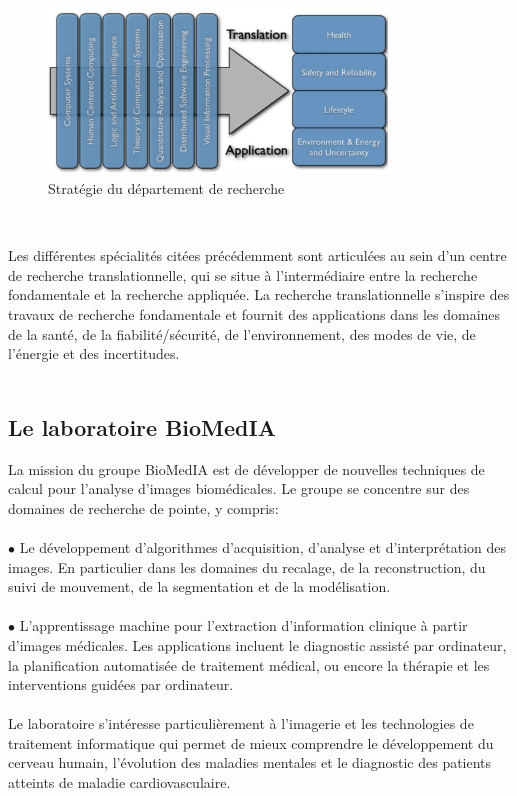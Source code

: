 \documentclass[10pt]{report}
\begin{document}
	\begin{figure}
		\includegraphics[width=9cm]{Reports/figures/research_strategy.jpg}
		\caption{Stratégie du département de recherche}
		\label{Stratégie du département de recherche}
	\end{figure}~\par
	
	Les différentes spécialités citées précédemment sont articulées au sein d'un centre de recherche translationnelle, qui se situe à l'intermédiaire entre la recherche fondamentale et la recherche appliquée. La recherche translationnelle s'inspire des travaux de recherche fondamentale et fournit des applications dans les domaines de la santé, de la fiabilité/sécurité, de l'environnement, des modes de vie, de l'énergie et des incertitudes.
	\\
	\\
	\subsection{Le laboratoire BioMedIA}

	La mission du groupe BioMedIA est de développer de nouvelles techniques de
	calcul pour l'analyse d'images biomédicales. Le groupe se concentre sur des
	domaines de recherche de pointe, y compris:\\
	\\{$\bullet$} Le développement d'algorithmes d'acquisition, d'analyse et d'interprétation des images. En particulier dans les domaines du recalage, de la reconstruction,
	du suivi de mouvement, de la segmentation et de la modélisation. \\
	\\{$\bullet$} L'apprentissage machine pour l'extraction d'information clinique à partir
	d'images médicales. Les applications incluent le diagnostic assisté par
	ordinateur, la planification automatisée de traitement médical, ou encore la thérapie et les interventions guidées par ordinateur. \\
	\\Le laboratoire s'intéresse particulièrement à l'imagerie et les technologies de
	traitement informatique qui permet de mieux comprendre le
	développement du cerveau humain, l’évolution des maladies mentales et le
	diagnostic des patients atteints de maladie cardiovasculaire.
	
\end{document}
